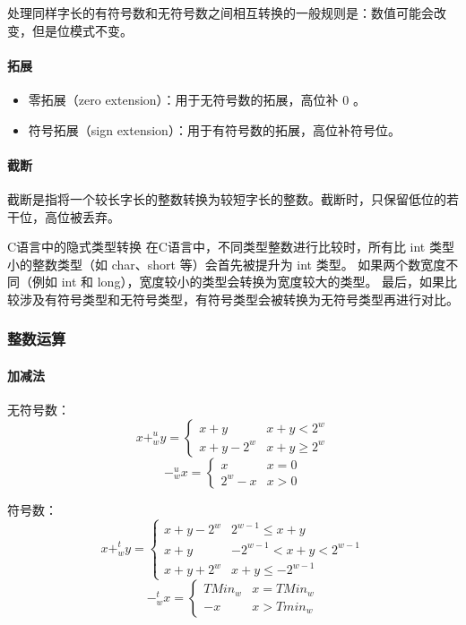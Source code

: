处理同样字长的有符号数和无符号数之间相互转换的一般规则是：数值可能会改变，但是位模式不变。

\paragraph{拓展}
\begin{itemize}
    \item 零拓展（zero extension）：用于无符号数的拓展，高位补 0 。
    \item 符号拓展（sign extension）：用于有符号数的拓展，高位补符号位。
\end{itemize}
\paragraph{截断}
截断是指将一个较长字长的整数转换为较短字长的整数。截断时，只保留低位的若干位，高位被丢弃。

\begin{sidenote}{C语言中的隐式类型转换}
    在C语言中，不同类型整数进行比较时，所有比 int 类型小的整数类型（如 char、short 等）会首先被提升为 int 类型。
    如果两个数宽度不同（例如 int 和 long），宽度较小的类型会转换为宽度较大的类型。
    最后，如果比较涉及有符号类型和无符号类型，有符号类型会被转换为无符号类型再进行对比。
\end{sidenote}

\subsubsection{整数运算}
\paragraph{加减法}

无符号数：
$$
    x +_w^u y =
    \begin{cases}
        x + y       & x + y < 2^w    \\
        x + y - 2^w & x + y \geq 2^w
    \end{cases}
$$
$$
    -_w^u x =
    \begin{cases}
        x       & x = 0 \\
        2^w - x & x > 0
    \end{cases}
$$

符号数：
$$
    x +_w^t y =
    \begin{cases}
        x + y - 2^w & 2^{w-1} \leq x + y         \\
        x + y       & -2^{w-1} < x + y < 2^{w-1} \\
        x + y + 2^w & x + y \leq -2^{w-1}
    \end{cases}
$$
$$
    -_w^t x =
    \begin{cases}
        TMin_w & x = TMin_w \\
        - x    & x > Tmin_w
    \end{cases}
$$
